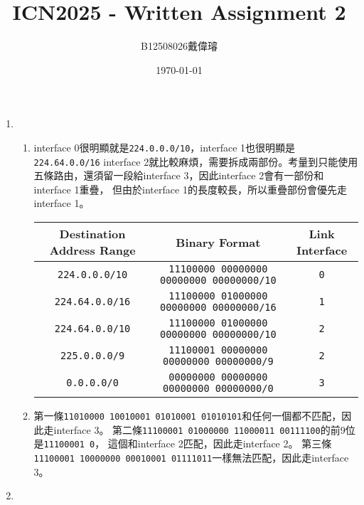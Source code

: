 \documentclass[12pt,a4paper]{article}
\title{ICN2025 - Written Assignment 2}
\author{B12508026戴偉璿}
\date{\today}
\begin{document}
\maketitle

\newpage

\begin{enumerate}
    \item \begin{enumerate}
        \item interface 0很明顯就是\texttt{224.0.0.0/10}，interface 1也很明顯是\texttt{224.64.0.0/16}
        interface 2就比較麻煩，需要拆成兩部份。考量到只能使用五條路由，還須留一段給interface 3，因此interface 2會有一部份和interface 1重疊，
        但由於interface 1的長度較長，所以重疊部份會優先走interface 1。
        \begin{table}[H]
        \centering
        \begin{tabular}{|c|c|c|}
            \hline
                        \textbf{Destination Address Range} & \textbf{Binary Format} & \textbf{Link Interface} \\ \hline
                        \texttt{224.0.0.0/10} & \texttt{11100000 00000000 00000000 00000000/10} & \texttt{0} \\ \hline 
                        \texttt{224.64.0.0/16} & \texttt{11100000 01000000 00000000 00000000/16} & \texttt{1} \\ \hline
                        \texttt{224.64.0.0/10} & \texttt{11100000 01000000 00000000 00000000/10} & \texttt{2} \\ \hline
                        \texttt{225.0.0.0/9} & \texttt{11100001 00000000 00000000 00000000/9} & \texttt{2} \\ \hline
                        \texttt{0.0.0.0/0} & \texttt{00000000 00000000 00000000 00000000/0} & \texttt{3} \\ \hline
        \end{tabular}
        \end{table}
        \item 第一條\texttt{11010000 10010001 01010001 01010101}和任何一個都不匹配，因此走interface 3。
        第二條\texttt{11100001 01000000 11000011 00111100}的前9位是\texttt{11100001 0}，
        這個和interface 2匹配，因此走interface 2。
        第三條\texttt{11100001 10000000 00010001 01111011}一樣無法匹配，因此走interface 3。
    \end{enumerate}
    \item \begin{enumerate}

\end{enumerate}
\end{enumerate}
\end{document}
